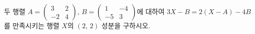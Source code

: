 \hspace*{2mm}\begin{minipage}[t]{\dimexpr\linewidth-2mm\relax}\vspace{0pt}
두 행렬 $A=\begin{pmatrix} 3 & 2 \\ -2 & 4 \end{pmatrix}$, $B=\begin{pmatrix} 1 & -4 \\ -5 & 3 \end{pmatrix}$에 대하여 $3X-B=2(X-A)-4B$를 만족시키는 행렬 $X$의 $(2,\,2)$ 성분을 구하시오.\end{minipage}
